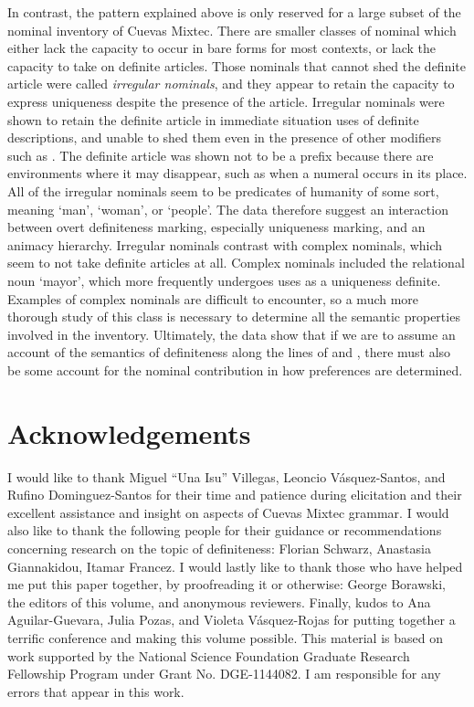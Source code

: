 \documentclass[output=paper,modfonts,nonflat]{langsci/langscibook}
\begin{document}
In contrast, the pattern explained above is only reserved for a large subset of the nominal inventory of Cuevas Mixtec.  There are smaller classes of nominal which either lack the capacity to occur in bare forms for most contexts, or lack the capacity to take on definite articles.  Those nominals that cannot shed the definite article were called \textit{irregular nominals}, and they appear to retain the capacity to express uniqueness despite the presence of the article.  Irregular nominals were shown to retain the definite article in immediate situation uses of definite descriptions, and unable to shed them even in the presence of other modifiers such as .  The definite article was shown not to be a prefix because there are environments where it may disappear, such as when a numeral occurs in its place.  All of the irregular nominals seem to be predicates of humanity of some sort, meaning `man', `woman', or `people'.  The data therefore suggest an interaction between overt definiteness marking, especially uniqueness marking, and an animacy hierarchy.  Irregular nominals contrast with complex nominals, which seem to not take definite articles at all.  Complex nominals included the relational noun `mayor', which more frequently undergoes uses as a uniqueness definite.  Examples of complex nominals are difficult to encounter, so a much more thorough study of this class is necessary to determine all the semantic properties involved in the inventory.  Ultimately, the data show that if we are to assume an account of the semantics of definiteness along the lines of \citeauthor{Schwarz2009} and \citeauthor{Jenks2015}, there must also be some account for the nominal contribution in how  preferences are determined.

\section*{Acknowledgements}

I would like to thank Miguel ``Una Isu'' Villegas, Leoncio V\'asquez-Santos, and Rufino Dominguez-Santos for their time and patience during elicitation and their excellent assistance and insight on aspects of Cuevas Mixtec grammar.  I would also like to thank the following people for their guidance or recommendations concerning research on the topic of definiteness: Florian Schwarz, Anastasia Giannakidou, Itamar Francez.  I would lastly like to thank those who have helped me put this paper together, by proofreading it or otherwise: George Borawski, the editors of this volume, and anonymous reviewers.  Finally, kudos to Ana Aguilar-Guevara, Julia Pozas, and Violeta V\'asquez-Rojas for putting together a terrific conference and making this volume possible.  This material is based on work supported by the National Science Foundation Graduate Research Fellowship Program under Grant No. DGE-1144082.  I am responsible for any errors that appear in this work.
\end{document}
